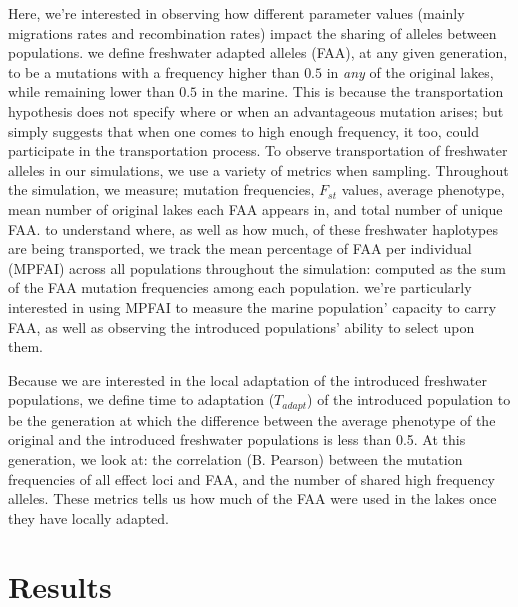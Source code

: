 \documentclass{article}
\begin{document}
Here, we're interested in observing how different parameter values
(mainly migrations rates and recombination rates)
impact the sharing of alleles between populations. 
we define freshwater adapted alleles (FAA),
at any given generation,
to be a mutations with a frequency higher than $0.5$ in \textit{any} of the original lakes, 
while remaining lower than $0.5$ in the marine. 
This is because the transportation hypothesis does not specify where or when an advantageous mutation arises; 
but simply suggests that when one comes to high enough frequency, it too, could participate in the transportation process. \cite{Schluter2009}
To observe transportation of freshwater alleles in our simulations, we use a variety of metrics when sampling.
Throughout the simulation, we measure;
mutation frequencies, 
$F_{st}$ values, 
average phenotype, 
mean number of original lakes each FAA appears in,
and total number of unique FAA. 
to understand where, as well as how much, of these freshwater haplotypes are being transported,
we track the mean percentage of FAA per individual (MPFAI) across all populations throughout the simulation:
computed as the sum of the FAA mutation frequencies among each population.
we're particularly interested in using MPFAI to measure the marine population' capacity to carry FAA,
as well as observing the introduced populations' ability to select upon them. 

Because we are interested in the local adaptation of the introduced freshwater populations,
we define time to adaptation ($T_{adapt}$) of the introduced population to be the generation at which
the difference between the average phenotype of the original and the introduced freshwater populations is less than 0.5. 
At this generation, we look at:
the correlation (B. Pearson) between the mutation frequencies of all effect loci and FAA,
and the number of shared high frequency alleles. 
These metrics tells us how much of the FAA  were used in the lakes once they have locally adapted. 


\section{Results}



\end{document}
